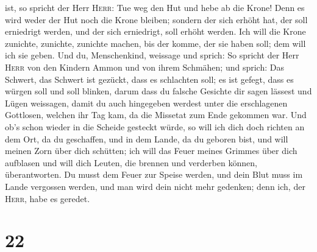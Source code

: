 ist,  so spricht der Herr \textsc{Herr}: Tue weg den Hut
und hebe ab die Krone! Denn es wird weder der Hut noch die Krone
bleiben; sondern der sich erhöht hat, der soll erniedrigt werden, und
der sich erniedrigt, soll erhöht werden.  Ich will die
Krone zunichte, zunichte, zunichte machen, bis der komme, der sie haben
soll; dem will ich sie geben.  Und du, Menschenkind,
weissage und sprich: So spricht der Herr \textsc{Herr} von den Kindern
Ammon und von ihrem Schmähen; und sprich: Das Schwert, das Schwert ist
gezückt, dass es schlachten soll; es ist gefegt, dass es würgen soll und
soll blinken,  darum dass du falsche Gesichte dir sagen
lässest und Lügen weissagen, damit du auch hingegeben werdest unter die
erschlagenen Gottlosen, welchen ihr Tag kam, da die Missetat zum Ende
gekommen war.  Und ob's schon wieder in die Scheide
gesteckt würde, so will ich dich doch richten an dem Ort, da du
geschaffen, und in dem Lande, da du geboren bist,  und
will meinen Zorn über dich schütten; ich will das Feuer meines Grimmes
über dich aufblasen und will dich Leuten, die brennen und verderben
können, überantworten.  Du musst dem Feuer zur Speise
werden, und dein Blut muss im Lande vergossen werden, und man wird dein
nicht mehr gedenken; denn ich, der \textsc{Herr}, habe es geredet.

\hypertarget{section-21}{%
\section{22}\label{section-21}}

